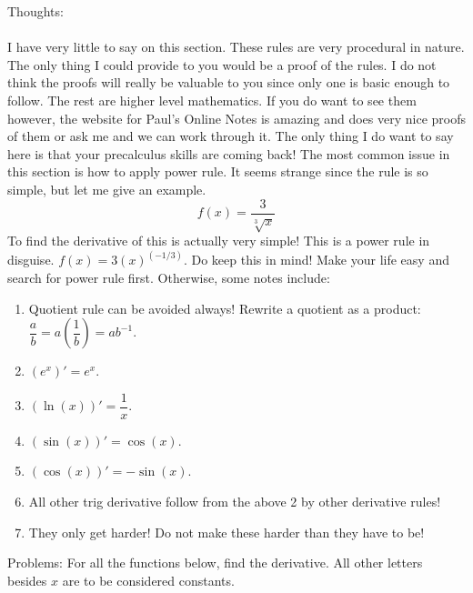 \documentclass[10pt]{article}
\theoremstyle{Theorem}
\theoremstyle{definition}
\theoremstyle{remark}
\theoremstyle{custom}
\begin{document}
\thispagestyle{firststyle}
\pagestyle{plain}

Thoughts:\\\\
I have very little to say on this section. These rules are very procedural in nature. The only thing I could provide to you would be a proof of the rules. I do not think the proofs will really be valuable to you since only one is basic enough to follow. The rest are higher level mathematics. If you do want to see them however, the website for Paul's Online Notes is amazing and does very nice proofs of them or ask me and we can work through it.  The only thing I do want to say here is that your precalculus skills are coming back! The most common issue in this section is how to apply power rule. It seems strange since the rule is so simple, but let me give an example.
\[
f(x)=\dfrac{3}{\sqrt[3]{x}}
\]
To find the derivative of this is actually very simple! This is a power rule in disguise. $f(x)=3(x)^{(-1/3)}$. Do keep this in mind! Make your life easy and search for power rule first.  Otherwise, some notes include:
\begin{enumerate}[1.]
\item Quotient rule can be avoided always! Rewrite a quotient as a product: $\dfrac{a}{b}=a\left(\dfrac{1}{b}\right)=ab^{-1}$.
\item $(e^x)'=e^x$.
\item $(\ln(x))'=\dfrac{1}{x}$.
\item $(\sin(x))'=\cos(x)$.
\item $(\cos(x))'=-\sin(x)$.
\item All other trig derivative follow from the above 2 by other derivative rules!
\item They only get harder! Do not make these harder than they have to be!
\end{enumerate}
\newpage
\noindent Problems: For all the functions below, find the derivative. All other letters besides $x$ are to be considered constants.
\end{document}
